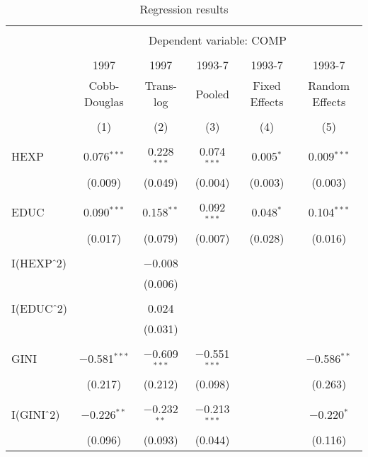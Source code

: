 \documentclass[12pt,a4paper]{article}\usepackage[]{graphicx}\usepackage[]{color}
\begin{document}


\begin{table}[!htbp] \centering 
  \caption{Regression results} 
  \label{tab:big} 
\scriptsize 
\begin{tabular}{@{\extracolsep{5pt}}lccccc} 
\\[-1.8ex]\hline 
\hline \\[-1.8ex] 
 & \multicolumn{5}{c}{Dependent variable: COMP} \\ 
\cline{2-6} 
\\[-1.8ex] & 1997 & 1997 & 1993-7 & 1993-7 & 1993-7 \\ 
 & Cobb-Douglas & Trans-log & Pooled & Fixed Effects & Random Effects \\ 
\\[-1.8ex] & (1) & (2) & (3) & (4) & (5)\\ 
\hline \\[-1.8ex] 
 HEXP & 0.076$^{***}$ & 0.228$^{***}$ & 0.074$^{***}$ & 0.005$^{*}$ & 0.009$^{***}$ \\ 
  & (0.009) & (0.049) & (0.004) & (0.003) & (0.003) \\ 
  & & & & & \\ 
 EDUC & 0.090$^{***}$ & 0.158$^{**}$ & 0.092$^{***}$ & 0.048$^{*}$ & 0.104$^{***}$ \\ 
  & (0.017) & (0.079) & (0.007) & (0.028) & (0.016) \\ 
  & & & & & \\ 
 I(HEXP$\hat{\mkern6mu}$2) &  & $-$0.008 &  &  &  \\ 
  &  & (0.006) &  &  &  \\ 
  & & & & & \\ 
 I(EDUC$\hat{\mkern6mu}$2) &  & 0.024 &  &  &  \\ 
  &  & (0.031) &  &  &  \\ 
  & & & & & \\ 
 GINI & $-$0.581$^{***}$ & $-$0.609$^{***}$ & $-$0.551$^{***}$ &  & $-$0.586$^{**}$ \\ 
  & (0.217) & (0.212) & (0.098) &  & (0.263) \\ 
  & & & & & \\ 
 I(GINI$\hat{\mkern6mu}$2) & $-$0.226$^{**}$ & $-$0.232$^{**}$ & $-$0.213$^{***}$ &  & $-$0.220$^{*}$ \\ 
  & (0.096) & (0.093) & (0.044) &  & (0.116) \\ 

\end{tabular}
\end{table}
\end{document}
